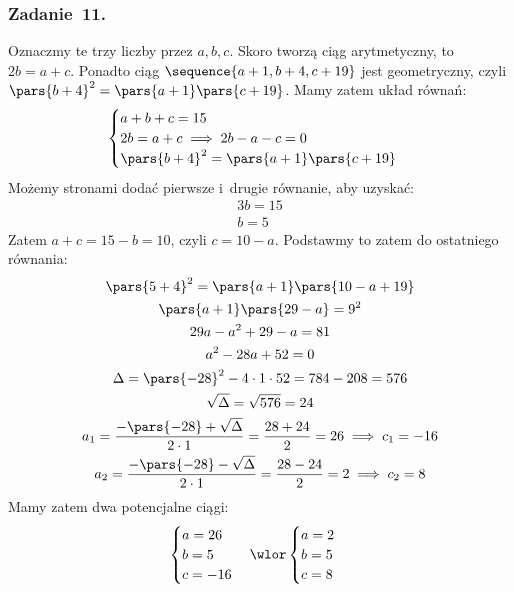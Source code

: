 \subsubsection*{Zadanie~11.}
Oznaczmy te trzy liczby przez \(a, b, c\). Skoro tworzą ciąg arytmetyczny, to \(2b = a + c\). Ponadto ciąg \(\sequence{a + 1, b + 4, c + 19}\) jest geometryczny, czyli \(\pars{b + 4}^2 = \pars{a + 1}\pars{c + 19}\). Mamy zatem układ równań:
\begin{equation*}
    \begin{cases}
        a + b + c = 15\\
        2b = a + c \implies 2b - a - c = 0\\
        \pars{b + 4}^2 = \pars{a + 1}\pars{c + 19}
    \end{cases}
\end{equation*}
Możemy stronami dodać pierwsze i~drugie równanie, aby uzyskać:
\begin{gather*}
    3b = 15\\
    b = 5
\end{gather*}
Zatem \(a + c = 15 - b = 10\), czyli \(c = 10 - a\). Podstawmy to zatem do ostatniego równania:
\begin{gather*}
    \pars{5 + 4}^2 = \pars{a + 1}\pars{10 - a + 19}\\
    \pars{a + 1}\pars{29 - a} = 9^2\\
    29a - a^2 + 29 - a = 81\\
    a^2 - 28a + 52 = 0\\
    \Delta = \pars{-28}^2 - 4 \cdot 1 \cdot 52 = 784 - 208 = 576\\
    \sqrt{\Delta} = \sqrt{576} = 24\\
    a_1 = \frac{-\pars{-28} + \sqrt{\Delta}}{2 \cdot 1} = \frac{28 + 24}{2} = 26 \implies c_1 = -16\\
    a_2 = \frac{-\pars{-28} - \sqrt{\Delta}}{2 \cdot 1} = \frac{28 - 24}{2} = 2 \implies c_2 = 8
\end{gather*}
Mamy zatem dwa potencjalne ciągi:
\begin{equation*}
    \begin{cases}
        a = 26\\
        b = 5\\
        c = -16
    \end{cases}
    \wlor
    \begin{cases}
        a = 2\\
        b = 5\\
        c = 8
    \end{cases}
\end{equation*}
